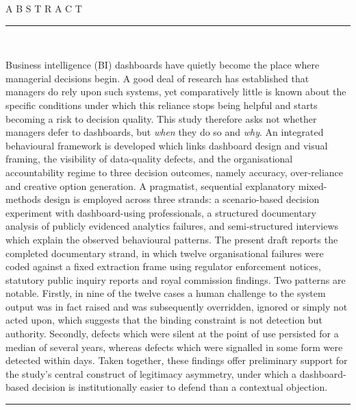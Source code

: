 \documentclass[11pt,a4paper]{article}
\numberwithin{figure}{section}
\numberwithin{table}{section}
\begin{document}
\begin{minipage}[t]{0.68\textwidth}
{\footnotesize\sffamily A B S T R A C T}\\[2pt]
{\color{rulegrey}\rule{\linewidth}{0.4pt}}\\[4pt]
{\footnotesize{}
Business intelligence (BI) dashboards have quietly become the place where managerial
decisions begin. A good deal of research has established that managers do rely upon such
systems, yet comparatively little is known about the specific conditions under which this
reliance stops being helpful and starts becoming a risk to decision quality. This study
therefore asks not whether managers defer to dashboards, but \emph{when} they do so and
\emph{why}. An integrated behavioural framework is developed which links dashboard design
and visual framing, the visibility of data-quality defects, and the organisational
accountability regime to three decision outcomes, namely accuracy, over-reliance and
creative option generation. A pragmatist, sequential explanatory mixed-methods design is
employed across three strands: a scenario-based decision experiment with dashboard-using
professionals, a structured documentary analysis of publicly evidenced analytics failures,
and semi-structured interviews which explain the observed behavioural patterns. The present
draft reports the completed documentary strand, in which twelve organisational failures were
coded against a fixed extraction frame using regulator enforcement notices, statutory public
inquiry reports and royal commission findings. Two patterns are notable. Firstly, in nine of
the twelve cases a human challenge to the system output was in fact raised and was
subsequently overridden, ignored or simply not acted upon, which suggests that the binding
constraint is not detection but authority. Secondly, defects which were silent at the point of
use persisted for a median of several years, whereas defects which were signalled in some
form were detected within days. Taken together, these findings offer preliminary support for
the study's central construct of legitimacy asymmetry, under which a dashboard-based decision
is institutionally easier to defend than a contextual objection.\par}
\end{minipage}

\vspace{8pt}
{\color{rulegrey}\rule{\textwidth}{0.5pt}}
\vspace{4pt}

\end{document}
